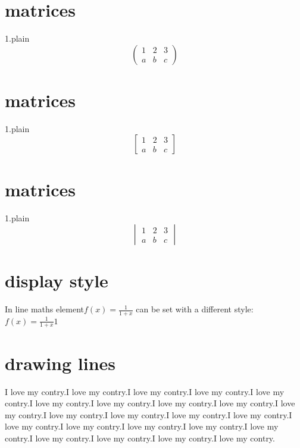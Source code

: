 \documentclass[12pt,openany]{book}
\begin{document}
\section{matrices}
1.plain
$$
\begin{pmatrix}
1 & 2 & 3 \\
a & b & c
\end{pmatrix}
$$
\section{matrices}
1.plain
$$
\begin{bmatrix}
1 & 2 & 3 \\
a & b & c
\end{bmatrix}
$$
\section{matrices}
1.plain
$$
\begin{vmatrix}
1 & 2 & 3 \\
a & b & c
\end{vmatrix}
$$
\section{display style}
In line maths element\(f(x)=\frac{1}{1+x}\) can be set with a different style:$ f(x)= \displaystyle \frac{1}{1+x}1 $

\section{drawing lines}

\vspace{3cm}


\vspace{3cm}


\vspace{3cm}


\begin{multicols}{2}
	I love my contry.I love my contry.I love my contry.I love my contry.I love my contry.I love my contry.I love my contry.I love my contry.I love my contry.I love my contry.I love my contry.I love my contry.I love my contry.I love my contry.I love my contry.I love my contry.I love my contry.I love my contry.I love my contry.I love my contry.I love my contry.I love my contry.I love my contry.
	
\end{multicols}
\end{document}
